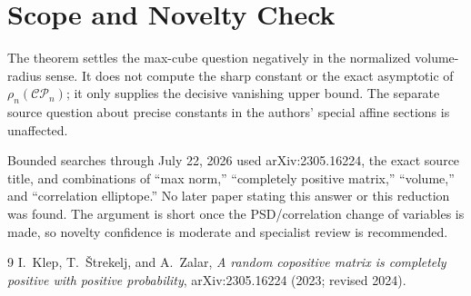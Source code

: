 \documentclass[11pt]{article}
\newcommand{\CP}{\mathcal{CP}}
\begin{document}
\section*{Scope and Novelty Check}

The theorem settles the max-cube question negatively in the normalized
volume-radius sense.  It does not compute the sharp constant or the exact
asymptotic of $\rho_n(\CP_n)$; it only supplies the decisive vanishing upper
bound.  The separate source question about precise constants in the authors'
special affine sections is unaffected.

Bounded searches through July 22, 2026 used arXiv:2305.16224, the exact source
title, and combinations of ``max norm,'' ``completely positive matrix,''
``volume,'' and ``correlation elliptope.''  No later paper stating this answer
or this reduction was found.  The argument is short once the PSD/correlation
change of variables is made, so novelty confidence is moderate and specialist
review is recommended.

\begin{thebibliography}{9}
I.~Klep, T.~\v{S}trekelj, and A.~Zalar,
\emph{A random copositive matrix is completely positive with positive
probability}, arXiv:2305.16224 (2023; revised 2024).
\end{thebibliography}
\end{document}
